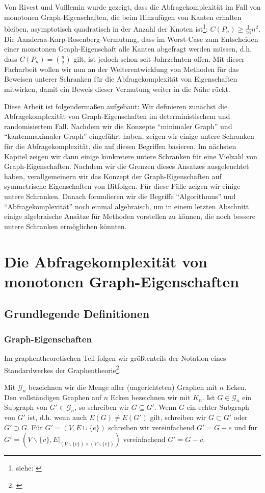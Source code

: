 \documentclass[10pt,a4paper, footheight=1mm, bibliography=totoc]{scrreprt}
\theoremstyle{definition}
\begin{document}
Von Rivest und Vuillemin wurde gezeigt,
dass die Abfragekomplexität
im Fall von monotonen Graph-Eigenschaften, die beim 
Hinzufügen von Kanten erhalten bleiben, asymptotisch
quadratisch in der Anzahl der Knoten
ist\footnote{siehe: \cite[Theorem 6]{Rivest}}: $C(P_n) \geq \frac{1}{16}n^2$.
Die Aanderaa-Karp-Rosenberg-Vermutung, dass im Worst-Case
zum Entscheiden einer monotonen Graph-Eigenschaft
alle Kanten abgefragt werden müssen, d.h. dass
$C(P_n)=\binom{n}{2}$ gilt, ist jedoch schon
seit Jahrzehnten offen. Mit dieser Facharbeit
wollen wir nun an der Weiterentwicklung von Methoden
für das Beweisen unterer
Schranken für die Abfragekomplexität
von Eigenschaften mitwirken, damit ein Beweis dieser Vermutung
weiter in die Nähe rückt.

Diese Arbeit ist folgendermaßen aufgebaut:
Wir definieren zunächst die Abfragekomplexität
von Graph-Eigenschaften im deterministischem und
randomisiertem Fall. Nachdem wir die Konzepte
"`minimaler Graph"' und "`kantenmaximaler Graph"'
eingeführt haben, zeigen wir einige untere Schranken
für die Abfragekomplexität, die auf diesen Begriffen
basieren. Im nächsten Kapitel zeigen wir dann einige
konkretere untere Schranken für eine Vielzahl von
Graph-Eigenschaften. Nachdem wir die Grenzen 
dieses Ansatzes ausgeleuchtet haben, verallgemeinern
wir das Konzept der Graph-Eigenschaften auf 
symmetrische Eigenschaften von Bitfolgen. Für
diese Fälle zeigen wir einige untere Schranken.
Danach formulieren wir die Begriffe "`Algorithmus"'
und "`Abfragekomplexität"' noch einmal algebraisch, um
in einem letzten Abschnitt
einige algebraische Ansätze für Methoden vorstellen zu
können, die noch bessere untere Schranken ermöglichen könnten.

\chapter{Die Abfragekomplexität von monotonen Graph-Eigenschaften}
\section{Grundlegende Definitionen}
\subsection{Graph-Eigenschaften}
Im graphentheoretischen Teil folgen wir größtenteils
der Notation eines Standardwerkes der Graphentheorie\footnote{\cite{diestel}}.

Mit $\mathcal{G}_n$ bezeichnen wir die Menge aller
(ungerichteten) Graphen mit $n$ Ecken.
Den vollständigen Graphen auf $n$ Ecken bezeichnen wir
mit $K_n$.
Ist $G \in \mathcal{G}_n$ ein Subgraph von $G' \in \mathcal{G}_n$,
so schreiben wir $G \subseteq G'$. Wenn $G$ ein
echter Subgraph von $G'$ ist, d.h. wenn auch $E(G) \neq E(G')$ gilt, schreiben
wir $G \subset G'$ oder $G' \supset G$.
Für $G' = (V, E \cup \{e\})$ schreiben wir vereinfachend
$G' = G + e$ und für 
$G' = (V \backslash \{v\}, E\big|_{(V \backslash \{v\})\times (V \backslash \{v\})})$ vereinfachend $G' = G - v$.
\end{document}

